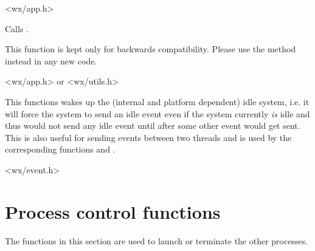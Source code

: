 <wx/app.h>


\label{wxyield}


Calls .

This function is kept only for backwards compatibility. Please use
the  method instead in any new code.


<wx/app.h> or <wx/utils.h>


\label{wxwakeupidle}


This functions wakes up the (internal and platform dependent) idle system, i.e. it
will force the system to send an idle event even if the system currently {\it is}
 idle and thus would not send any idle event until after some other event would get
sent. This is also useful for sending events between two threads and is used by
the corresponding functions  and
.


<wx/event.h>



\section{Process control functions}\label{processfunctions}

The functions in this section are used to launch or terminate the other
processes.


\label{wxexecute}






